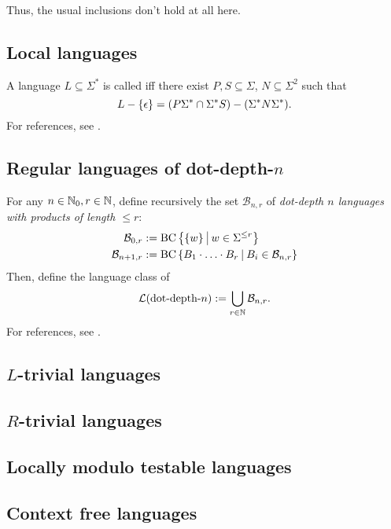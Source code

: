 Thus, the usual inclusions don't hold at all here.

\subsection{Local languages}
\label{lang:local}
A language $L \subseteq \Sigma^*$ is called  iff there exist $P,S \subseteq \Sigma$, $N \subseteq \Sigma^2$ such that
\[ L - \Set{\epsilon} = (P\Sigma^* \cap \Sigma^* S) - (\Sigma^* N \Sigma^*). \]
For references, see \cite{Berstel1996439}.

\subsection{Regular languages of dot-depth-$n$}
\label{lang:dotdepth}
For any $n \in \mathbb{N}_0, r \in \mathbb{N}$, define recursively the set $\mathcal{B}_{n,r}$ of \emph{dot-depth $n$ languages with products of length $\le r$}:
\begin{align*}
\mathcal{B}_{0,r} & := \BC \Set{\Set{w}}{w \in \Sigma^{\le r}} \\
\mathcal{B}_{n+1,r} & := \BC \Set{B_1 \cdot \dotsc \cdot B_r}{B_i \in \mathcal{B}_{n,r}}
\end{align*}
Then, define the language class of 
\[ \mathcal{L}(\textup{\textrm{dot-depth-$n$}}) := \bigcup_{r\in\mathbb{N}} \mathcal{B}_{n,r} . \]
For references, see \cite{ConcatGameDotDepth}.

\subsection{$L$-trivial languages}
\label{lang:Ltrivial}
\subsection{$R$-trivial languages}
\label{lang:Rtrivial}
\subsection{Locally modulo testable languages}
\label{lang:LmodT}


\subsection{Context free languages}
\label{lang:contextfree}


